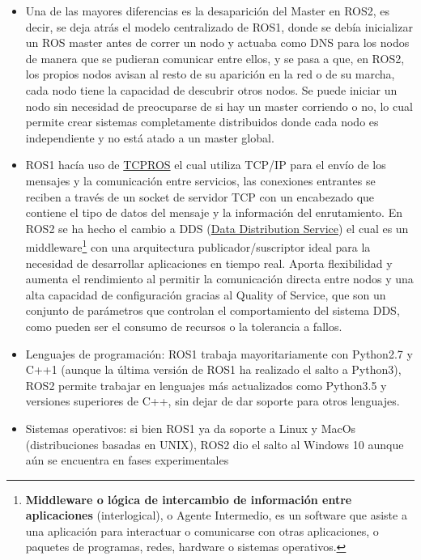 \begin{itemize}
    \item Una de las mayores diferencias es la desaparición del Master en ROS2, es decir, se deja atrás el modelo centralizado de ROS1, donde se debía inicializar un ROS master antes de correr un nodo y actuaba como DNS para los nodos de manera que se pudieran comunicar entre ellos, y se pasa a que, en ROS2, los propios nodos avisan al resto de su aparición en la red o de su marcha, cada nodo tiene la capacidad de descubrir otros nodos. Se puede iniciar un nodo sin necesidad de preocuparse de si hay un master corriendo o no, lo cual permite crear sistemas completamente distribuidos donde cada nodo es independiente y no está atado a un master global.
    \item ROS1 hacía uso de \href{http://wiki.ros.org/ROS/TCPROS}{TCPROS} el cual utiliza TCP/IP para el envío de los mensajes y la comunicación entre servicios, las conexiones entrantes se reciben a través de un socket de servidor TCP con un encabezado que contiene el tipo de datos del mensaje y la información del enrutamiento. En ROS2 se ha hecho el cambio a DDS (\href{https://design.ros2.org/articles/ros_on_dds.html}{Data Distribution Service}) el cual es un middleware\footnote{\textbf{Middleware o lógica de intercambio de información entre aplicaciones} (interlogical), o Agente Intermedio, es un software que asiste a una aplicación para interactuar o comunicarse con otras aplicaciones, o paquetes de programas, redes, hardware o sistemas operativos.} con una arquitectura publicador/suscriptor ideal para la necesidad de desarrollar aplicaciones en tiempo real. Aporta flexibilidad y aumenta el rendimiento al permitir la comunicación directa entre nodos y una alta capacidad de configuración gracias al Quality of Service, que son un conjunto de parámetros que controlan el comportamiento del sistema DDS, como pueden ser el consumo de recursos o la tolerancia a fallos.
    \item Lenguajes de programación: ROS1 trabaja mayoritariamente con Python2.7 y C++1 (aunque la última versión de ROS1 ha realizado el salto a Python3), ROS2 permite trabajar en lenguajes más actualizados como Python3.5 y versiones superiores de C++, sin dejar de dar soporte para otros lenguajes.
    \item Sistemas operativos: si bien ROS1 ya da soporte a Linux y MacOs (distribuciones basadas en UNIX), ROS2 dio el salto al Windows 10 aunque aún se encuentra en fases experimentales
\end{itemize}


